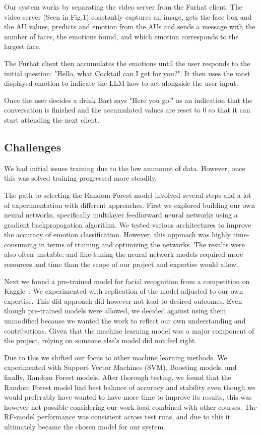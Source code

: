 \documentclass[conference]{IEEEtran}
\begin{document}
Our system works by separating the video server from the Furhat client. The video server (Seen in Fig.1) constantly captures an image,
gets the face box and the AU values, predicts and emotion from the AUs and sends a message with the number of faces, the emotions found, and which emotion corresponds to the largest face.

The Furhat client then accumulates the emotions until the user responds to the initial question: "Hello, what Cocktail can I get for you?".
It then uses the most displayed emotion to indicate the LLM how to act alongside the user input.

Once the user decides a drink Bart says "Here you go!" as an indication that the conversation is finished and the accumulated values are reset to 0 so that
it can start attending the next client.
\subsection{Challenges}
We had initial issues training due to the low ammount of data. However, once this was solved training progressed more steadily.


The path to selecting the Random Forest model involved several steps and a lot of experimentation with different approaches. First we explored building our own neural networks, specifically multilayer feedforward neural networks using a gradient backpropagation algorithm. We tested various architectures to improve the accuracy of emotion classification. However, this approach was highly time-consuming in terms of training and optimizing the networks. The results were also often unstable, and fine-tuning the neural network models required more resources and time than the scope of our project and expertise would allow.


Next we found a pre-trained model for facial recognition from a competition on Kaggle~\cite{kaggle}. We experimented with replication of the model adjusted to our own expertise. This did approach did however not lead to desired outcomes. Even though pre-trained models were allowed, we decided against using them unmodified because we wanted the work to reflect our own understanding and contributions. Given that the machine learning model was a major component of the project, relying on someone else’s model did not feel right.

Due to this we shifted our focus to other machine learning methods. We experimented with Support Vector Machines (SVM), Boosting models, and finally, Random Forest models. After thorough testing, we found that the Random Forest model had best balance of accuracy and stability even though we would preferably have wanted to have more time to improve its results, this was however not possible considering our work load combined with other courses. The RF-model performance was consistent across test runs, and due to this it ultimately became the chosen model for our system.
\end{document}
